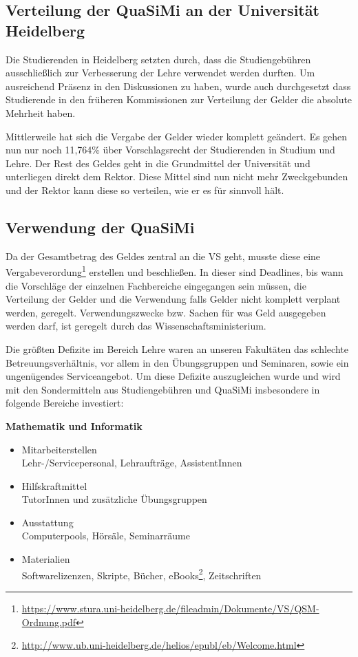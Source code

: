 \subsection*{Verteilung der QuaSiMi an der Universität Heidelberg}

Die Studierenden in Heidelberg setzten durch, dass die Studiengebühren
ausschließlich zur Verbesserung der Lehre verwendet werden durften. Um
ausreichend Präsenz in den Diskussionen zu haben, wurde auch durchgesetzt dass
Studierende in den früheren Kommissionen zur Verteilung der Gelder die absolute Mehrheit
haben. 

Mittlerweile hat sich die Vergabe der Gelder wieder komplett geändert. Es gehen
nun nur noch 11,764\% über Vorschlagsrecht der Studierenden in Studium und
Lehre. Der Rest des Geldes geht in die Grundmittel der Universität und
unterliegen direkt dem Rektor. Diese Mittel sind nun nicht mehr Zweckgebunden
und der Rektor kann diese so verteilen, wie er es für sinnvoll hält. 


\subsection*{Verwendung der QuaSiMi}

Da der Gesamtbetrag des Geldes zentral an die VS geht, musste diese eine
Vergabeverordung\footnote{\url{https://www.stura.uni-heidelberg.de/fileadmin/Dokumente/VS/QSM-Ordnung.pdf}}
erstellen und beschließen. In dieser sind Deadlines, bis wann die Vorschläge
der einzelnen Fachbereiche eingegangen sein müssen, die Verteilung der Gelder
und die Verwendung falls Gelder nicht komplett verplant werden, geregelt.
Verwendungszwecke bzw. Sachen für was Geld ausgegeben werden darf, ist geregelt
durch das Wissenschaftsministerium.

Die größten Defizite im Bereich Lehre waren an unseren Fakultäten das schlechte
Betreuungsverhältnis, vor allem in den Übungsgruppen und Seminaren, sowie ein
ungenügendes Serviceangebot. Um diese Defizite auszugleichen wurde und wird mit
den Sondermitteln aus Studiengebühren und QuaSiMi insbesondere in folgende
Bereiche investiert:

\vspace{5mm}
\textbf{Mathematik und Informatik}
\begin{itemize}
 \item {Mitarbeiterstellen}\\Lehr-/Servicepersonal, Lehraufträge, AssistentInnen
\item {Hilfskraftmittel}\\ TutorInnen und zusätzliche Übungsgruppen
\item {Ausstattung}\\ Computerpools, Hörsäle, Seminarräume
\item {Materialien}\\ Softwarelizenzen, Skripte, Bücher, eBooks\footnote{\url{http://www.ub.uni-heidelberg.de/helios/epubl/eb/Welcome.html}}, Zeitschriften
\end{itemize}

